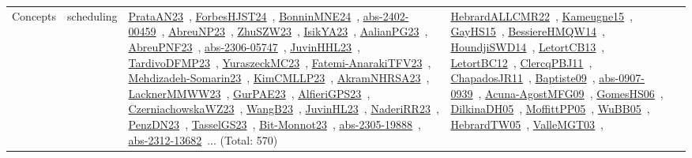 {\begin{longtable}{lp{3cm}>{\raggedright\arraybackslash}p{6cm}>{\raggedright\arraybackslash}p{6cm}>{\raggedright\arraybackslash}p{8cm}}
Concepts & scheduling & \href{../works/PrataAN23.pdf}{PrataAN23}~\cite{PrataAN23}, \href{../works/ForbesHJST24.pdf}{ForbesHJST24}~\cite{ForbesHJST24}, \href{../works/BonninMNE24.pdf}{BonninMNE24}~\cite{BonninMNE24}, \href{../works/abs-2402-00459.pdf}{abs-2402-00459}~\cite{abs-2402-00459}, \href{../works/AbreuNP23.pdf}{AbreuNP23}~\cite{AbreuNP23}, \href{../works/ZhuSZW23.pdf}{ZhuSZW23}~\cite{ZhuSZW23}, \href{../works/IsikYA23.pdf}{IsikYA23}~\cite{IsikYA23}, \href{../works/AalianPG23.pdf}{AalianPG23}~\cite{AalianPG23}, \href{../works/AbreuPNF23.pdf}{AbreuPNF23}~\cite{AbreuPNF23}, \href{../works/abs-2306-05747.pdf}{abs-2306-05747}~\cite{abs-2306-05747}, \href{../works/JuvinHHL23.pdf}{JuvinHHL23}~\cite{JuvinHHL23}, \href{../works/TardivoDFMP23.pdf}{TardivoDFMP23}~\cite{TardivoDFMP23}, \href{../works/YuraszeckMC23.pdf}{YuraszeckMC23}~\cite{YuraszeckMC23}, \href{../works/Fatemi-AnarakiTFV23.pdf}{Fatemi-AnarakiTFV23}~\cite{Fatemi-AnarakiTFV23}, \href{../works/Mehdizadeh-Somarin23.pdf}{Mehdizadeh-Somarin23}~\cite{Mehdizadeh-Somarin23}, \href{../works/KimCMLLP23.pdf}{KimCMLLP23}~\cite{KimCMLLP23}, \href{../works/AkramNHRSA23.pdf}{AkramNHRSA23}~\cite{AkramNHRSA23}, \href{../works/LacknerMMWW23.pdf}{LacknerMMWW23}~\cite{LacknerMMWW23}, \href{../works/GurPAE23.pdf}{GurPAE23}~\cite{GurPAE23}, \href{../works/AlfieriGPS23.pdf}{AlfieriGPS23}~\cite{AlfieriGPS23}, \href{../works/CzerniachowskaWZ23.pdf}{CzerniachowskaWZ23}~\cite{CzerniachowskaWZ23}, \href{../works/WangB23.pdf}{WangB23}~\cite{WangB23}, \href{../works/JuvinHL23.pdf}{JuvinHL23}~\cite{JuvinHL23}, \href{../works/NaderiRR23.pdf}{NaderiRR23}~\cite{NaderiRR23}, \href{../works/PenzDN23.pdf}{PenzDN23}~\cite{PenzDN23}, \href{../works/TasselGS23.pdf}{TasselGS23}~\cite{TasselGS23}, \href{../works/Bit-Monnot23.pdf}{Bit-Monnot23}~\cite{Bit-Monnot23}, \href{../works/abs-2305-19888.pdf}{abs-2305-19888}~\cite{abs-2305-19888}, \href{../works/abs-2312-13682.pdf}{abs-2312-13682}~\cite{abs-2312-13682}... (Total: 570) & \href{../works/HebrardALLCMR22.pdf}{HebrardALLCMR22}~\cite{HebrardALLCMR22}, \href{../works/Kameugne15.pdf}{Kameugne15}~\cite{Kameugne15}, \href{../works/GayHS15.pdf}{GayHS15}~\cite{GayHS15}, \href{../works/BessiereHMQW14.pdf}{BessiereHMQW14}~\cite{BessiereHMQW14}, \href{../works/HoundjiSWD14.pdf}{HoundjiSWD14}~\cite{HoundjiSWD14}, \href{../works/LetortCB13.pdf}{LetortCB13}~\cite{LetortCB13}, \href{../works/LetortBC12.pdf}{LetortBC12}~\cite{LetortBC12}, \href{../works/ClercqPBJ11.pdf}{ClercqPBJ11}~\cite{ClercqPBJ11}, \href{../works/ChapadosJR11.pdf}{ChapadosJR11}~\cite{ChapadosJR11}, \href{../works/Baptiste09.pdf}{Baptiste09}~\cite{Baptiste09}, \href{../works/abs-0907-0939.pdf}{abs-0907-0939}~\cite{abs-0907-0939}, \href{../works/Acuna-AgostMFG09.pdf}{Acuna-AgostMFG09}~\cite{Acuna-AgostMFG09}, \href{../works/GomesHS06.pdf}{GomesHS06}~\cite{GomesHS06}, \href{../works/DilkinaDH05.pdf}{DilkinaDH05}~\cite{DilkinaDH05}, \href{../works/MoffittPP05.pdf}{MoffittPP05}~\cite{MoffittPP05}, \href{../works/WuBB05.pdf}{WuBB05}~\cite{WuBB05}, \href{../works/HebrardTW05.pdf}{HebrardTW05}~\cite{HebrardTW05}, \href{../works/ValleMGT03.pdf}{ValleMGT03}~\cite{ValleMGT03}, 
\end{longtable}}
